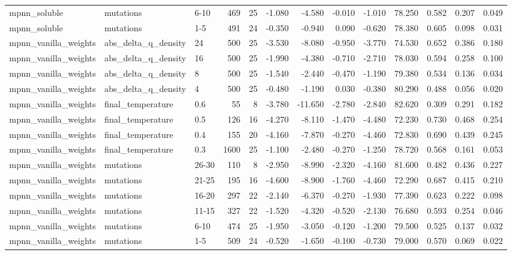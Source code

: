 \begin{table}
\begin{tabular}{lllrrrrrrrrrr}
mpnn\_soluble & mutations & 6-10 & 469 & 25 & -1.080 & -4.580 & -0.010 & -1.010 & 78.250 & 0.582 & 0.207 & 0.049 \\
mpnn\_soluble & mutations & 1-5 & 491 & 24 & -0.350 & -0.940 & 0.090 & -0.620 & 78.380 & 0.605 & 0.098 & 0.031 \\
mpnn\_vanilla\_weights & abs\_delta\_q\_density & 24 & 500 & 25 & -3.530 & -8.080 & -0.950 & -3.770 & 74.530 & 0.652 & 0.386 & 0.180 \\
mpnn\_vanilla\_weights & abs\_delta\_q\_density & 16 & 500 & 25 & -1.990 & -4.380 & -0.710 & -2.710 & 78.030 & 0.594 & 0.258 & 0.100 \\
mpnn\_vanilla\_weights & abs\_delta\_q\_density & 8 & 500 & 25 & -1.540 & -2.440 & -0.470 & -1.190 & 79.380 & 0.534 & 0.136 & 0.034 \\
mpnn\_vanilla\_weights & abs\_delta\_q\_density & 4 & 500 & 25 & -0.480 & -1.190 & 0.030 & -0.380 & 80.290 & 0.488 & 0.056 & 0.020 \\
mpnn\_vanilla\_weights & final\_temperature & 0.6 & 55 & 8 & -3.780 & -11.650 & -2.780 & -2.840 & 82.620 & 0.309 & 0.291 & 0.182 \\
mpnn\_vanilla\_weights & final\_temperature & 0.5 & 126 & 16 & -4.270 & -8.110 & -1.470 & -4.480 & 72.230 & 0.730 & 0.468 & 0.254 \\
mpnn\_vanilla\_weights & final\_temperature & 0.4 & 155 & 20 & -4.160 & -7.870 & -0.270 & -4.460 & 72.830 & 0.690 & 0.439 & 0.245 \\
mpnn\_vanilla\_weights & final\_temperature & 0.3 & 1600 & 25 & -1.100 & -2.480 & -0.270 & -1.250 & 78.720 & 0.568 & 0.161 & 0.053 \\
mpnn\_vanilla\_weights & mutations & 26-30 & 110 & 8 & -2.950 & -8.990 & -2.320 & -4.160 & 81.600 & 0.482 & 0.436 & 0.227 \\
mpnn\_vanilla\_weights & mutations & 21-25 & 195 & 16 & -4.600 & -8.900 & -1.760 & -4.460 & 72.290 & 0.687 & 0.415 & 0.210 \\
mpnn\_vanilla\_weights & mutations & 16-20 & 297 & 22 & -2.140 & -6.370 & -0.270 & -1.930 & 77.390 & 0.623 & 0.222 & 0.098 \\
mpnn\_vanilla\_weights & mutations & 11-15 & 327 & 22 & -1.520 & -4.320 & -0.520 & -2.130 & 76.680 & 0.593 & 0.254 & 0.046 \\
mpnn\_vanilla\_weights & mutations & 6-10 & 474 & 25 & -1.950 & -3.050 & -0.120 & -1.200 & 79.500 & 0.525 & 0.137 & 0.032 \\
mpnn\_vanilla\_weights & mutations & 1-5 & 509 & 24 & -0.520 & -1.650 & -0.100 & -0.730 & 79.000 & 0.570 & 0.069 & 0.022 \\

\end{tabular}
\end{table}
